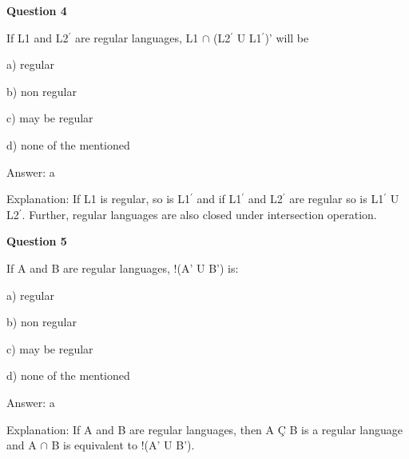 \documentclass{article}
\begin{document}
\begin{mdframed}[linewidth=1pt, roundcorner=5pt, linecolor=gray!30, backgroundcolor=gray!5]
\textbf{Question 4} 

If L1 and L2$^\prime$ are regular languages, L1 $\cap$ (L2$^\prime$ U L1$^\prime$)' will be

a) regular

b) non regular

c) may be regular

d) none of the mentioned
\vspace{5pt} \par
\begin{tcolorbox}[colback=green!5, colframe=green!40!black, title=Solution]
Answer: a

Explanation: If L1 is regular, so is L1$^\prime$ and if L1$^\prime$ and L2$^\prime$ are regular so is L1$^\prime$ U L2$^\prime$. Further, regular  languages are also closed under intersection operation.
\end{tcolorbox}
\end{mdframed}

\begin{mdframed}[linewidth=1pt, roundcorner=5pt, linecolor=gray!30, backgroundcolor=gray!5]
\textbf{Question 5} 

If A and B are regular languages, !(A' U B') is:

a) regular

b) non regular

c) may be regular

d) none of the mentioned
\vspace{5pt} \par
\begin{tcolorbox}[colback=green!5, colframe=green!40!black, title=Solution]
Answer: a

Explanation: If A and B are regular languages, then A Ç B is a regular language and  A $\cap$ B is equivalent to  !(A' U B').
\end{tcolorbox}
\end{mdframed}
\end{document}
